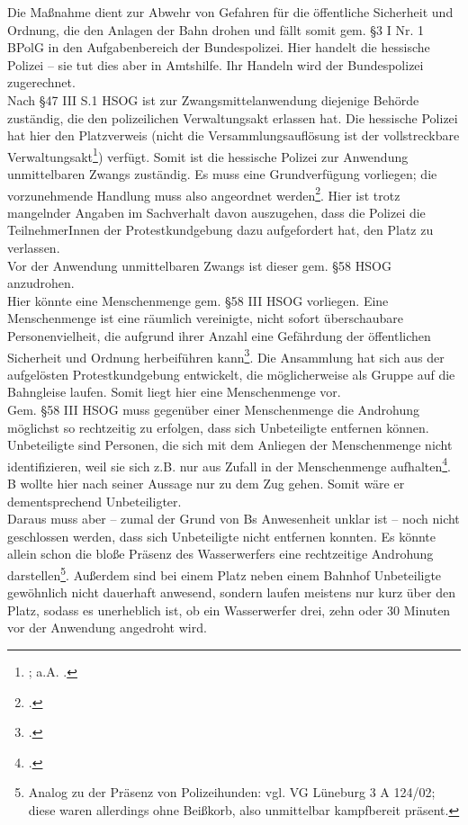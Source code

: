 \documentclass[widefront, ngerman]{jura}
\begin{document}
\levelup {}
Die Maßnahme dient zur Abwehr von Gefahren für die öffentliche Sicherheit und Ordnung, die den Anlagen der Bahn drohen und fällt somit gem. §3 I Nr. 1 BPolG in den Aufgabenbereich 
der Bundespolizei. Hier handelt die hessische Polizei -- sie tut dies aber in Amtshilfe. Ihr Handeln wird der Bundespolizei zugerechnet. \\
Nach §47 III S.1 HSOG ist zur Zwangsmittelanwendung diejenige Behörde zuständig, die den polizeilichen Verwaltungsakt erlassen hat. Die hessische Polizei hat hier den Platzverweis (nicht die Versammlungsauflösung ist der vollstreckbare Verwaltungsakt\footnote{\cite[Kniesel/Poscher][J Rn 394]{HandbuchPolizeirecht}; a.A. \cite[Rn 429]{Gusy}.}) verfügt. Somit ist die hessische Polizei zur Anwendung unmittelbaren Zwangs zuständig.
Es muss eine Grundverfügung vorliegen; die vorzunehmende Handlung muss also angeordnet werden\footcite[Rn 452]{Gusy}. Hier ist trotz mangelnder Angaben im Sachverhalt davon auszugehen, dass die Polizei die TeilnehmerInnen der Protestkundgebung dazu aufgefordert hat, den Platz zu verlassen.\\
Vor der Anwendung unmittelbaren Zwangs ist dieser gem. §58 HSOG anzudrohen.\\
Hier könnte eine Menschenmenge gem. §58 III HSOG vorliegen. Eine Menschenmenge ist eine räumlich vereinigte, nicht sofort überschaubare Personenvielheit, die aufgrund ihrer Anzahl eine Gefährdung der öffentlichen Sicherheit und Ordnung herbeiführen kann\footcite[§58 Rn 9]{HornmannHSOG}. Die Ansammlung hat sich aus der aufgelösten Protestkundgebung entwickelt, die möglicherweise als Gruppe auf die Bahngleise laufen. Somit liegt hier eine Menschenmenge vor.\\
Gem. §58 III HSOG muss gegenüber einer Menschenmenge die Androhung möglichst so rechtzeitig zu erfolgen, dass sich Unbeteiligte entfernen können. Unbeteiligte sind Personen, die sich mit dem Anliegen der Menschenmenge nicht identifizieren, weil sie sich z.B. nur aus Zufall in der Menschenmenge aufhalten\footcite[§58 Rn 10]{HornmannHSOG}. B wollte hier nach seiner Aussage nur zu dem Zug gehen. Somit wäre er dementsprechend Unbeteiligter.\\
Daraus muss aber -- zumal der Grund von Bs Anwesenheit unklar ist -- noch nicht geschlossen werden, dass sich Unbeteiligte nicht entfernen konnten. Es könnte allein schon die bloße Präsenz des Wasserwerfers eine rechtzeitige Androhung darstellen\footnote{Analog zu der Präsenz von Polizeihunden: vgl. VG Lüneburg 3 A 124/02; diese waren allerdings ohne Beißkorb, also unmittelbar kampfbereit präsent.}. Außerdem sind bei einem Platz neben einem Bahnhof Unbeteiligte gewöhnlich nicht dauerhaft anwesend, sondern laufen meistens nur kurz über den Platz, sodass es unerheblich ist, ob ein Wasserwerfer drei, zehn oder 30 Minuten vor der Anwendung angedroht wird.
\end{document}
